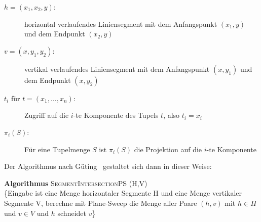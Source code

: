 \documentclass[ngerman,draft,parskip=half*,twoside]{scrreprt}
\theoremstyle{break}
\theoremstyle{nonumberbreak}
\begin{document}
\begin{description}

\item[$h=(x_1,x_2,y)$:] horizontal verlaufendes Liniensegment mit dem
    Anfangspunkt $(x_1,y)$ und dem Endpunkt $(x_2,y)$
\item[$v=(x,y_1,y_2)$:] vertikal verlaufendes Liniensegment mit dem
    Anfangspunkt $(x,y_1)$ und dem Endpunkt $(x,y_2)$
\item[$t_i$ für $t=(x_1,\dots,x_n)$:] Zugriff auf die $i$-te Komponente des 
   Tupels $t$, also $t_i=x_i$
\item[$\pi_i(S)$:] Für eine Tupelmenge $S$ ist $\pi_i(S)$ die Projektion
   auf die $i$-te Komponente
\end{description} 

Der Algorithmus nach Güting~\cite{guting} gestaltet sich dann in dieser Weise:

\textbf{Algorithmus} \textsc{SegmentIntersectionPS (H,V)}\\
\{Eingabe ist eine Menge horizontaler Segmente H und eine Menge vertikaler
 Segmente V, berechne mit Plane-Sweep die Menge aller Paare $(h,v)$
mit $h{\in}H$ und $v{\in}V$ und $h$ schneidet $v$\}
\end{document}
